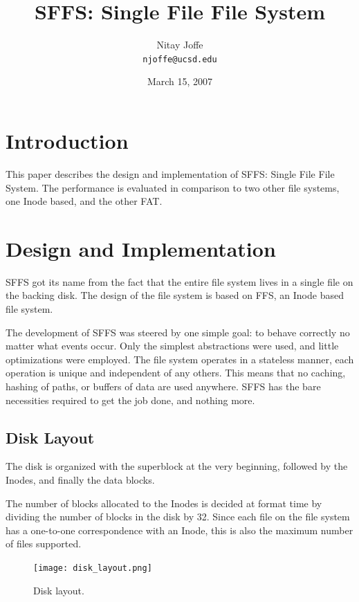 \documentclass[10pt,twocolumn]{article}
\begin{document}
\title{SFFS: Single File File System}
\author{Nitay Joffe\\\texttt{njoffe@ucsd.edu}}
\date{March 15, 2007}
\maketitle

\section{Introduction}
This paper describes the design and implementation of SFFS:
Single File File System. The performance is evaluated in
comparison to two other file systems, one Inode based, and the other FAT.

\section{Design and Implementation}
SFFS got its name from the fact that the entire file system lives in a single
file on the backing disk. The design of the file system is based on FFS, an
Inode based file system.

The development of SFFS was steered by one simple goal: to behave
correctly no matter what events occur. Only the simplest abstractions were 
used, and little optimizations were employed. The file system operates in a 
stateless manner, each operation is unique and independent of any others. This 
means that no caching, hashing of paths, or buffers of data are used anywhere. 
SFFS has the bare necessities required to get the job done, and nothing more.

  \subsection{Disk Layout}
  The disk is organized with the superblock at the very beginning, followed by
  the Inodes, and finally the data blocks.
  
  The number of blocks allocated to the Inodes is decided at format time by
  dividing the number of blocks in the disk by 32. Since each file on the file   
  system has a one-to-one correspondence with an Inode, this is also the 
  maximum number of files supported.
  \begin{figure}[h]
    \begin{center}
      \texttt{[image: disk\_layout.png]}
      \label{fig:disk_layout}
      \caption{Disk layout.}
    \end{center}
  \end{figure}
\end{document}
